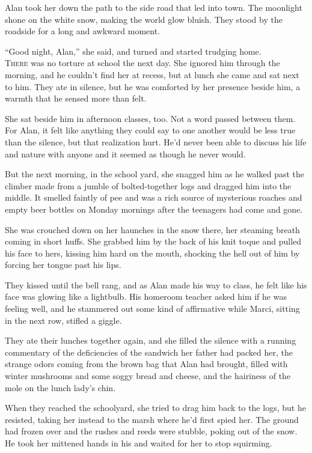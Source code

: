 \documentclass{article}
\begin{document}
Alan took her down the path to the side road that led into town.  The
moonlight shone on the white snow, making the world glow bluish.  They
stood by the roadside for a long and awkward moment.

``Good night, Alan,'' she said, and turned and started trudging home.
\\
\lettrine[lines=3, lhang=.5, nindent=0pt, findent=2pt]{T}{here} was no torture at school the next day.  She ignored him through
the morning, and he couldn't find her at recess, but at lunch she came
and sat next to him.  They ate in silence, but he was comforted by her
presence beside him, a warmth that he sensed more than felt.

She sat beside him in afternoon classes, too.  Not a word passed
between them.  For Alan, it felt like anything they could say to one
another would be less true than the silence, but that realization
hurt.  He'd never been able to discuss his life and nature with anyone
and it seemed as though he never would.

But the next morning, in the school yard, she snagged him as he walked
past the climber made from a jumble of bolted-together logs and
dragged him into the middle.  It smelled faintly of pee and was a rich
source of mysterious roaches and empty beer bottles on Monday mornings
after the teenagers had come and gone.

She was crouched down on her haunches in the snow there, her steaming
breath coming in short huffs.  She grabbed him by the back of his knit
toque and pulled his face to hers, kissing him hard on the mouth,
shocking the hell out of him by forcing her tongue past his lips.

They kissed until the bell rang, and as Alan made his way to class, he
felt like his face was glowing like a lightbulb.  His homeroom teacher
asked him if he was feeling well, and he stammered out some kind of
affirmative while Marci, sitting in the next row, stifled a giggle.

They ate their lunches together again, and she filled the silence with
a running commentary of the deficiencies of the sandwich her father
had packed her, the strange odors coming from the brown bag that Alan
had brought, filled with winter mushrooms and some soggy bread and
cheese, and the hairiness of the mole on the lunch lady's chin.

When they reached the schoolyard, she tried to drag him back to the
logs, but he resisted, taking her instead to the marsh where he'd
first spied her.  The ground had frozen over and the rushes and reeds
were stubble, poking out of the snow.  He took her mittened hands in
his and waited for her to stop squirming.
\end{document}

